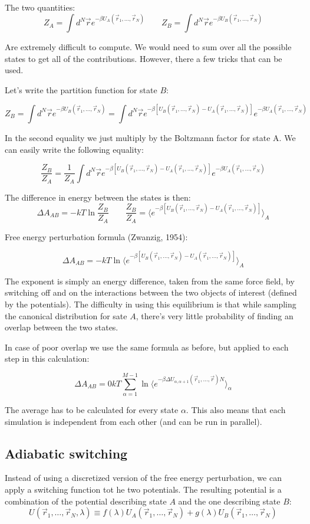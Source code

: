The two quantities:
$$Z_A = \int d^N\vec{r}e^{-\beta U_A(\vec{r}_1, \dots, \vec{r}_N)}\qquad Z_B = \int d^N\vec{r}e^{-\beta U_B(\vec{r}_1, \dots, \vec{r}_N)}$$

Are extremely difficult to compute. 
We would need to sum over all the possible states to get all of the contributions.
However, there a few tricks that can be used.

Let's write the partition function for state $B$:

$$Z_B = \int d^N\vec{r}e^{-\beta U_B(\vec{r}_1, \dots, \vec{r}_N)} = \int d^N\vec{r}e^{-\beta[U_B(\vec{r}_1, \dots, \vec{r}_N)-U_{A}(\vec{r}_1, \dots, \vec{r}_N)]}e^{-\beta U_A(\vec{r}_1, \dots, \vec{r}_N)}$$

In the second equality we just multiply by the Boltzmann factor for state A.
We can easily write the following equality:

$$\frac{Z_B}{Z_A} = \frac{1}{Z_A}\int d^N\vec{r}e^{-\beta[U_B(\vec{r}_1, \dots, \vec{r}_N)-U_{A}(\vec{r}_1, \dots, \vec{r}_N)]}e^{-\beta U_A(\vec{r}_1, \dots, \vec{r}_N)}$$

The difference in energy between the states is then:
$$\Delta A_{AB} = -kT\ln\frac{Z_B}{Z_A}\qquad\frac{Z_B}{Z_A} = \biggl\langle e^{-\beta[U_B(\vec{r}_1, \dots, \vec{r}_N)-U_A(\vec{r}_1, \dots, \vec{r}_N)]}\biggr\rangle_A$$

Free energy perturbation formula (Zwanzig, 1954):

$$\Delta A_{AB} = -kT\ln\biggl\langle e^{-\beta[U_B(\vec{r}_1, \dots, \vec{r}_N)-U_A(\vec{r}_1, \dots, \vec{r}_N)]}\biggr\rangle_A$$

The exponent is simply an energy difference, taken from the same force field, by switching off and on the interactions between the two objects of interest (defined by the potentials). 
The difficulty in using this equilibrium is that while sampling the canonical distribution for sate $A$, there's very little probability of finding an overlap between the two states.

In case of poor overlap we use the same formula as before, but applied to each step in this calculation:

$$\Delta A_{AB}=0kT\sum\limits_{\alpha=1}^{M-1}\ln\bigl\langle e^{-\beta\Delta U_{\alpha, \alpha+1}(\vec{r}_1, \dots,\vec{r})N}\bigr\rangle_\alpha$$

The average has to be calculated for every state $\alpha$.
This also means that each simulation is independent from each other (and can be run in parallel).

	\subsection{Adiabatic switching}
Instead of using a discretized version of the free energy perturbation, we can apply a switching function tot he two potentials.
The resulting potential is a combination of the potential describing state $A$ and the one describing state $B$:
	$$U(\vec{r}_1, \dots, \vec{r}_N, \lambda) \equiv f(\lambda)U_A(\vec{r}_1, \dots, \vec{r}_N)+g(\lambda)U_B(\vec{r}_1, \dots, \vec{r}_N)$$
	
